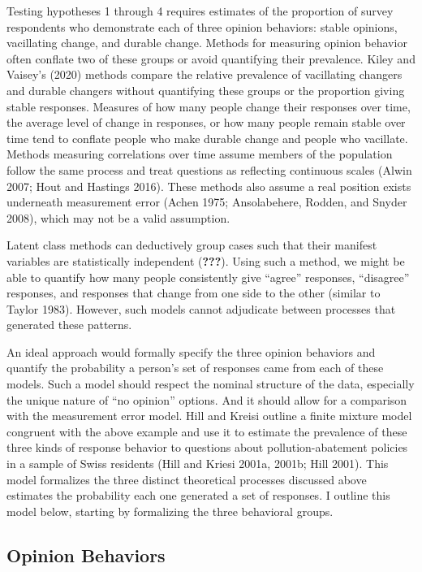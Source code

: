 \documentclass[12pt,]{article}
\begin{document}
Testing hypotheses 1 through 4 requires estimates of the proportion of survey respondents who demonstrate each of three opinion behaviors: stable opinions, vacillating change, and durable change. Methods for measuring opinion behavior often conflate two of these groups or avoid quantifying their prevalence. Kiley and Vaisey's (2020) methods compare the relative prevalence of vacillating changers and durable changers without quantifying these groups or the proportion giving stable responses. Measures of how many people change their responses over time, the average level of change in responses, or how many people remain stable over time tend to conflate people who make durable change and people who vacillate. Methods measuring correlations over time assume members of the population follow the same process and treat questions as reflecting continuous scales (Alwin 2007; Hout and Hastings 2016). These methods also assume a real position exists underneath measurement error (Achen 1975; Ansolabehere, Rodden, and Snyder 2008), which may not be a valid assumption.

Latent class methods can deductively group cases such that their manifest variables are statistically independent ({\textbf{???}}). Using such a method, we might be able to quantify how many people consistently give ``agree'' responses, ``disagree'' responses, and responses that change from one side to the other (similar to Taylor 1983). However, such models cannot adjudicate between processes that generated these patterns.

An ideal approach would formally specify the three opinion behaviors and quantify the probability a person's set of responses came from each of these models. Such a model should respect the nominal structure of the data, especially the unique nature of ``no opinion'' options. And it should allow for a comparison with the measurement error model. Hill and Kreisi outline a finite mixture model congruent with the above example and use it to estimate the prevalence of these three kinds of response behavior to questions about pollution-abatement policies in a sample of Swiss residents (Hill and Kriesi 2001a, 2001b; Hill 2001). This model formalizes the three distinct theoretical processes discussed above estimates the probability each one generated a set of responses. I outline this model below, starting by formalizing the three behavioral groups.

\hypertarget{opinion-behaviors}{%
\subsection{Opinion Behaviors}\label{opinion-behaviors}}
\end{document}
